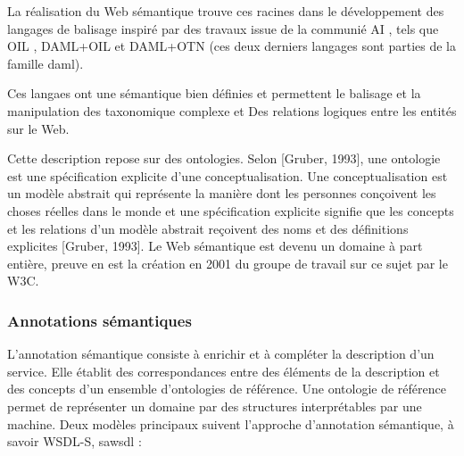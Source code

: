 	    La réalisation du Web sémantique trouve ces racines dans le développement des langages de balisage inspiré
	    par des travaux issue de la communié AI \cite{mcilraith2001semantic}, tels que 
	    \textsc{OIL} \cite{fensel2001oil}, \textsc{DAML+OIL} \cite{horrocks2002daml+oil} et \textsc{DAML+OTN} 
	    \cite{mcguinness2003daml} (ces deux derniers langages sont parties de la famille \acrshort{daml}).

	    Ces langaes ont une sémantique bien définies et permettent le balisage et la manipulation des taxonomique
	    complexe et Des relations logiques entre les entités sur le Web.

	    Cette description repose sur des ontologies. Selon [Gruber, 1993], une ontologie est une spécification
	    explicite d'une conceptualisation. Une conceptualisation est un modèle abstrait qui représente la
	    manière dont les personnes conçoivent les choses réelles dans le monde et une spécification explicite
	    signifie que les concepts et les relations d'un modèle abstrait reçoivent des noms et des définitions
	    explicites [Gruber, 1993]. Le Web sémantique est devenu un domaine à part entière, preuve en est la
	    création en 2001 du groupe de travail sur ce sujet par le \textsc{W3C}.




	    \subsubsection{Annotations sémantiques}
	    L'annotation sémantique consiste à enrichir et à compléter la description d'un service\cite{elie2010}. 
	    Elle établit des correspondances entre des éléments de la description et des concepts d'un ensemble 
	    d'ontologies de référence. Une ontologie de référence permet de représenter un domaine par des structures 
	    interprétables par une machine. Deux modèles principaux suivent l'approche d'annotation sémantique, 
	    à savoir \textsc{WSDL-S}\cite{akkiraju2005web}, \acrshort{sawsdl} \cite{kopecky2007sawsdl}:

